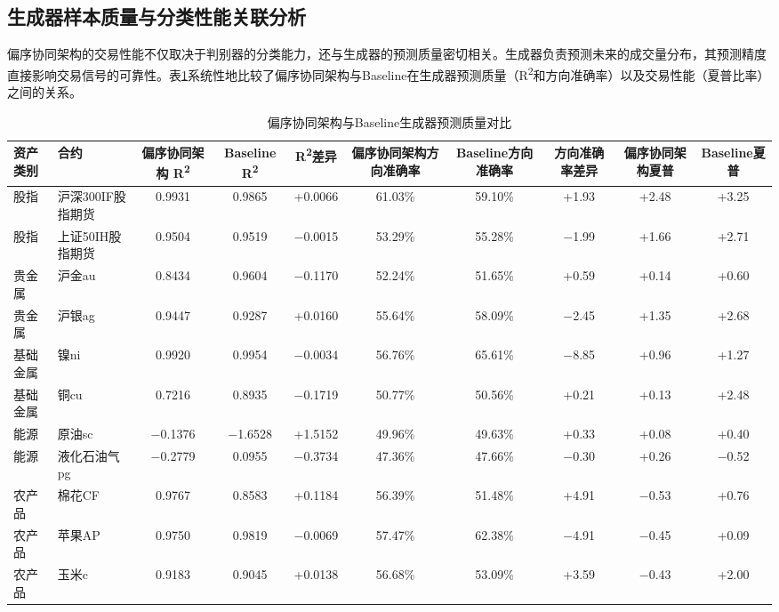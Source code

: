 \subsection{生成器样本质量与分类性能关联分析}

偏序协同架构的交易性能不仅取决于判别器的分类能力，还与生成器的预测质量密切相关。生成器负责预测未来的成交量分布，其预测精度直接影响交易信号的可靠性。表\ref{tab:gcaPredictionQuality}系统性地比较了偏序协同架构与Baseline在生成器预测质量（R\textsuperscript{2}和方向准确率）以及交易性能（夏普比率）之间的关系。

\begin{table}
\centering
\footnotesize
\caption{偏序协同架构与Baseline生成器预测质量对比}
\label{tab:gcaPredictionQuality}
\begin{tabular}{llcccccccc}
\toprule
\textbf{资产类别} & \textbf{合约} & \textbf{偏序协同架构 R\textsuperscript{2}} & \textbf{Baseline R\textsuperscript{2}} & \textbf{R\textsuperscript{2}差异} & \textbf{偏序协同架构方向准确率} & \textbf{Baseline方向准确率} & \textbf{方向准确率差异} & \textbf{偏序协同架构夏普} & \textbf{Baseline夏普} \\
\midrule
股指 & 沪深300IF股指期货 & 0.9931 & 0.9865 & +0.0066 & 61.03\% & 59.10\% & +1.93 & +2.48 & +3.25 \\
股指 & 上证50IH股指期货 & 0.9504 & 0.9519 & $-$0.0015 & 53.29\% & 55.28\% & $-$1.99 & +1.66 & +2.71 \\
贵金属 & 沪金au & 0.8434 & 0.9604 & $-$0.1170 & 52.24\% & 51.65\% & +0.59 & +0.14 & +0.60 \\
贵金属 & 沪银ag & 0.9447 & 0.9287 & +0.0160 & 55.64\% & 58.09\% & $-$2.45 & +1.35 & +2.68 \\
基础金属 & 镍ni & 0.9920 & 0.9954 & $-$0.0034 & 56.76\% & 65.61\% & $-$8.85 & +0.96 & +1.27 \\
基础金属 & 铜cu & 0.7216 & 0.8935 & $-$0.1719 & 50.77\% & 50.56\% & +0.21 & +0.13 & +2.48 \\
能源 & 原油sc & $-$0.1376 & $-$1.6528 & +1.5152 & 49.96\% & 49.63\% & +0.33 & +0.08 & +0.40 \\
能源 & 液化石油气pg & $-$0.2779 & 0.0955 & $-$0.3734 & 47.36\% & 47.66\% & $-$0.30 & +0.26 & $-$0.52 \\
农产品 & 棉花CF & 0.9767 & 0.8583 & +0.1184 & 56.39\% & 51.48\% & +4.91 & $-$0.53 & +0.76 \\
农产品 & 苹果AP & 0.9750 & 0.9819 & $-$0.0069 & 57.47\% & 62.38\% & $-$4.91 & $-$0.45 & +0.09 \\
农产品 & 玉米c & 0.9183 & 0.9045 & +0.0138 & 56.68\% & 53.09\% & +3.59 & $-$0.43 & +2.00 \\

\end{tabular}
\end{table}
